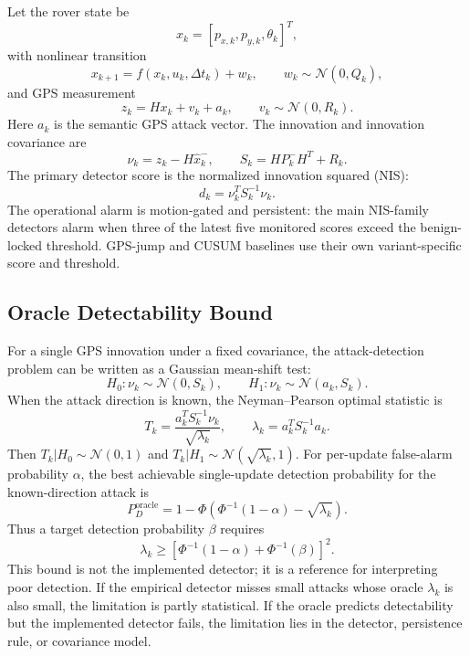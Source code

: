 \documentclass[conference]{IEEEtran}
\begin{document}
Let the rover state be
\begin{equation}
    x_k = [p_{x,k}, p_{y,k}, \theta_k]^T,
\end{equation}
with nonlinear transition
\begin{equation}
    x_{k+1} = f(x_k, u_k, \Delta t_k) + w_k,
    \qquad w_k \sim \mathcal{N}(0,Q_k),
\end{equation}
and GPS measurement
\begin{equation}
    z_k = Hx_k + v_k + a_k,
    \qquad v_k \sim \mathcal{N}(0,R_k).
\end{equation}
Here $a_k$ is the semantic GPS attack vector. The innovation and innovation
covariance are
\begin{equation}
    \nu_k = z_k - H\hat{x}_k^-,
    \qquad
    S_k = HP_k^-H^T + R_k.
\end{equation}
The primary detector score is the normalized innovation squared (NIS):
\begin{equation}
    d_k = \nu_k^T S_k^{-1}\nu_k.
\end{equation}
The operational alarm is motion-gated and persistent: the main NIS-family
detectors alarm when three of the latest five monitored scores exceed the
benign-locked threshold. GPS-jump and CUSUM baselines use their own
variant-specific score and threshold.

\subsection{Oracle Detectability Bound}

For a single GPS innovation under a fixed covariance, the attack-detection
problem can be written as a Gaussian mean-shift test:
\begin{equation}
    H_0:\nu_k\sim\mathcal{N}(0,S_k),
    \qquad
    H_1:\nu_k\sim\mathcal{N}(a_k,S_k).
\end{equation}
When the attack direction is known, the Neyman--Pearson optimal statistic is
\begin{equation}
    T_k = \frac{a_k^T S_k^{-1}\nu_k}{\sqrt{\lambda_k}},
    \qquad
    \lambda_k = a_k^T S_k^{-1}a_k.
\end{equation}
Then $T_k|H_0\sim\mathcal{N}(0,1)$ and
$T_k|H_1\sim\mathcal{N}(\sqrt{\lambda_k},1)$. For per-update false-alarm
probability $\alpha$, the best achievable single-update detection probability
for the known-direction attack is
\begin{equation}
    P_D^{\mathrm{oracle}} =
    1-\Phi\left(\Phi^{-1}(1-\alpha)-\sqrt{\lambda_k}\right).
\end{equation}
Thus a target detection probability $\beta$ requires
\begin{equation}
    \lambda_k \geq
    \left[\Phi^{-1}(1-\alpha)+\Phi^{-1}(\beta)\right]^2.
\end{equation}
This bound is not the implemented detector; it is a reference for
interpreting poor detection. If the empirical detector misses small attacks
whose oracle $\lambda_k$ is also small, the limitation is partly statistical.
If the oracle predicts detectability but the implemented detector fails, the
limitation lies in the detector, persistence rule, or covariance model.
\end{document}
